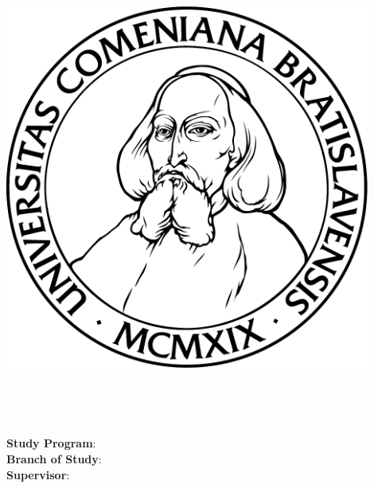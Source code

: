 \ifx\draft\undefined
\thispagestyle{empty}
\begin{minipage}{0.20\textwidth}
	\includegraphics[width=0.9\textwidth]{../figures/logouni}
\end{minipage}
\begin{minipage}{0.79\textwidth}
\begin{center}
  \Large \sc \mfuniversity \\
  \mffaculty
\end{center}
\end{minipage}
\vspace{7cm}
\begin{center}
  {\Huge \mftitle}\\
  \large \mfthesistype
\end{center}
\vspace{7cm}

\noindent
{\bf Study Program}: \mfstudyprogram\\
{\bf Branch of Study}: \mfbranchofstudy\\
{\bf Supervisor}: \mfadvisor

\vfill
\noindent
\mfplacedate \hfill {\large \mfauthor}\\

